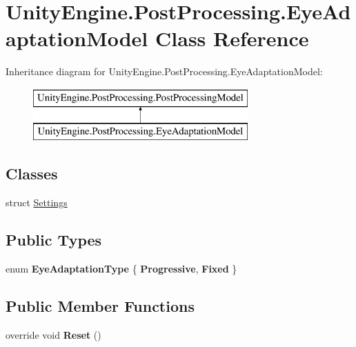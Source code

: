 \hypertarget{class_unity_engine_1_1_post_processing_1_1_eye_adaptation_model}{}\section{Unity\+Engine.\+Post\+Processing.\+Eye\+Adaptation\+Model Class Reference}
\label{class_unity_engine_1_1_post_processing_1_1_eye_adaptation_model}
Inheritance diagram for Unity\+Engine.\+Post\+Processing.\+Eye\+Adaptation\+Model\+:\begin{figure}[H]
\begin{center}
\leavevmode
\includegraphics[height=2.000000cm]{class_unity_engine_1_1_post_processing_1_1_eye_adaptation_model}
\end{center}
\end{figure}
\subsection*{Classes}
\begin{DoxyCompactItemize}
\item 
struct \hyperlink{struct_unity_engine_1_1_post_processing_1_1_eye_adaptation_model_1_1_settings}{Settings}
\end{DoxyCompactItemize}
\subsection*{Public Types}
\begin{DoxyCompactItemize}
\item 
\mbox{\label{class_unity_engine_1_1_post_processing_1_1_eye_adaptation_model_ab9307d267c9dc71faf8705f539a5d30b}} 
enum {\bfseries Eye\+Adaptation\+Type} \{ {\bfseries Progressive}, 
{\bfseries Fixed}
 \}
\end{DoxyCompactItemize}
\subsection*{Public Member Functions}
\begin{DoxyCompactItemize}
\item 
\mbox{\label{class_unity_engine_1_1_post_processing_1_1_eye_adaptation_model_a055eae23b68fd6d5b6ab1d98c306e814}} 
override void {\bfseries Reset} ()
\end{DoxyCompactItemize}
